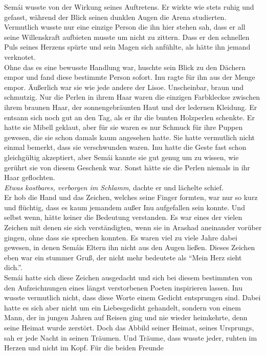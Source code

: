 Semái wusste von der Wirkung seines Auftretens. Er wirkte wie stets ruhig und gefasst, während der 
Blick seinen dunklen Augen die Arena studierten. Vermutlich wusste nur eine einzige Person die ihn 
hier stehen sah, dass er all seine Willenskraft aufbieten musste um nicht zu zittern. Dass er den 
schnellen Puls seines Herzens spürte und sein Magen sich anfühlte, als hätte ihn jemand 
verknotet.\\
Ohne das es eine bewusste Handlung war, huschte sein Blick zu den Dächern empor und fand diese 
bestimmte Person sofort. Inu ragte für ihn aus der Menge empor. Äußerlich war sie wie jede andere 
der Lisoe. Unscheinbar, braun und schmutzig. Nur die Perlen in ihrem Haar waren die einzigen 
Farbkleckse zwischen ihrem braunen Haar, der sonnengebräunten Haut und der ledernen Kleidung. Er 
entsann sich noch gut an den Tag, als er ihr die bunten Holzperlen schenkte. Er hatte sie Mibell 
geklaut, aber für sie waren es nur Schmuck für ihre Puppen gewesen, die sie schon damals kaum 
angesehen hatte. Sie hatte vermutlich nicht einmal bemerkt, dass sie verschwunden waren. Inu hatte 
die Geste fast schon gleichgültig akzeptiert, aber Semái kannte sie gut genug um zu wissen, wie 
gerührt sie von diesem Geschenk war. Sonst hätte sie die Perlen niemals in ihr Haar geflochten.\\
\textit{Etwas kostbares, verborgen im Schlamm}, dachte er und lächelte schief.\\
Er hob die Hand und das Zeichen, welches seine Finger formten, war nur so kurz und flüchtig, dass 
es kaum jemandem außer Inu aufgefallen sein konnte. Und selbst wenn, hätte keiner die Bedeutung 
verstanden. Es war eines der vielen Zeichen mit denen sie sich verständigten, wenn sie in Arashad 
aneinander vorüber gingen, ohne dass sie sprechen konnten. Es waren viel zu viele Jahre dabei 
gewesen, in denen Semáis Eltern ihn nicht aus den Augen ließen. Dieses Zeichen eben war ein stummer 
Gruß, der nicht mehr bedeutete als ``Mein Herz sieht dich.''. \\
Semái hatte sich diese Zeichen ausgedacht und sich bei diesem bestimmten von den Aufzeichnungen 
eines längst verstorbenen Poeten inspirieren lassen. Inu wusste vermutlich nicht, dass diese Worte 
einem Gedicht entsprungen sind. Dabei hatte es sich aber nicht um ein Liebesgedicht gehandelt, 
sondern von einem Mann, der in jungen Jahren auf Reisen ging und nie wieder heimkehrte, denn seine 
Heimat wurde zerstört. Doch das Abbild seiner Heimat, seines Ursprungs, sah er jede Nacht in seinen 
Träumen. Und Träume, dass wusste jeder, ruhten im Herzen und nicht im Kopf. Für die beiden Freunde 
